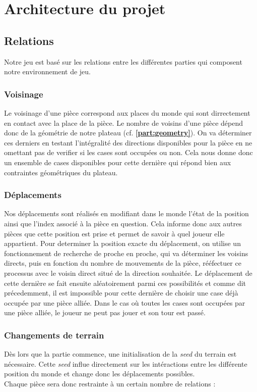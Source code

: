 \chapter{Architecture du projet}
\section{Relations}
    Notre jeu est basé sur les relations entre les différentes parties qui composent notre environnement de jeu.   
    \subsection{Voisinage}
        Le voisinage d'une pièce correspond aux places du monde qui sont dirrectement en contact avec la place de la pièce. Le nombre de voisins d'une pièce dépend donc de la géométrie de notre plateau (cf. \textbf{\ref{part:geometry}}). On va déterminer ces derniers en testant l'intégralité des directions disponibles pour la pièce en ne omettant pas de verifier si les cases sont occupées ou non. Cela nous donne donc un ensemble de cases disponibles pour cette dernière qui répond bien aux contraintes géométriques du plateau.
    \subsection{Déplacements}
        Nos déplacements sont réalisés en modifiant dans le monde l'état de la position ainsi que l'index associé à la pièce en question. Cela informe donc aux autres pièces que cette position est prise et permet de savoir à quel joueur elle appartient.
        \medbreak
        Pour determiner la position exacte du déplacement, on utilise un fonctionnement de recherche de proche en proche, qui va déterminer les voisins directs, puis en fonction du nombre de mouvements de la pièce, rééfectuer ce processus avec le voisin direct situé de la direction souhaitée. Le déplacement de cette dernière se fait ensuite aléatoirement parmi ces possibilités et comme dit précedemment, il est impossible pour cette dernière de choisir une case déjà occupée par une pièce alliée.
        \medbreak
        \noindent Dans le cas où toutes les cases sont occupées par une pièce alliée, le joueur ne peut pas jouer et son tour est passé.
        
    \subsection{Changements de terrain}
        Dès lors que la partie commence, une initialisation de la \textit{seed} du terrain est nécessaire. \newline
        Cette \textit{seed} influe directement sur les intéractions entre les différente position du monde et change donc les déplacements possibles. \\ Chaque pièce sera donc restrainte à un certain nombre de relations :
        
